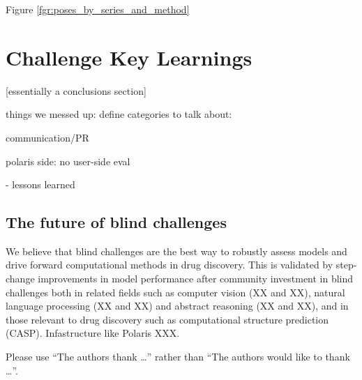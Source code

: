 \documentclass[journal=jcim,manuscript=article]{achemso}
\begin{document}
Figure \ref{fgr:poses_by_series_and_method}

\section{Challenge Key Learnings}
[essentially a conclusions section]


things we messed up:
define categories to talk about:

communication/PR


polaris side:
no user-side eval



- lessons learned


\subsection{The future of blind challenges}

We believe that blind challenges are the best way to robustly assess models and drive forward computational methods in drug discovery. This is validated by step-change improvements in model performance after community investment in blind challenges both in related fields such as computer vision (XX and XX), natural language processing (XX and XX) and abstract reasoning (XX and XX), and in those relevant to drug discovery such as computational structure prediction (CASP). Infastructure like Polaris XXX. 

















\begin{acknowledgement}

Please use ``The authors thank \ldots'' rather than ``The
authors would like to thank \ldots''.

\end{acknowledgement}
\end{document}
